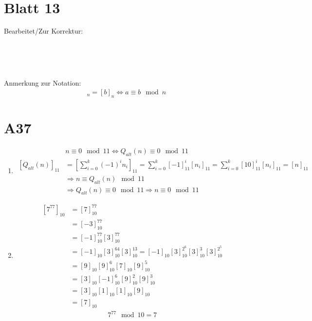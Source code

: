 \documentclass[fleqn,12pt]{scrartcl}
\newcommand{\blattn}{Blatt 13}
\begin{document}
\section*{\blattn}
Bearbeitet/Zur Korrektur:

\noindent
\begin{Form}
	\\
	\\
	\\
\end{Form}


Anmerkung zur Notation:
\begin{align*}
	[a]_n = [b]_n \Leftrightarrow a \equiv b \mod n
\end{align*}
\section*{A37}
\begin{enumerate}
	\item
		\begin{align*}
			&n \equiv 0 \mod 11 \Leftrightarrow Q_{alt}(n) \equiv 0  \mod 11\\
		\left[Q_{alt}(n)\right]_{11} &= \left[\sum_{i=0}^k (-1)^in_i\right]_{11} = \sum_{i=0}^k [-1]_{11}^i [n_i]_{11}
																							 = \sum_{i=0}^k
																							 [10]_{11}^i [n_i]_{11} = [n]_{11}\\
																							 &\Rightarrow n \equiv Q_{alt}(n) \mod 11\\
		&\Rightarrow Q_{alt}(n) \equiv 0 \mod 11\Rightarrow n \equiv 0 \mod 11 
		\end{align*}


	\item
		\begin{align*}
			\left[7^{77}\right]_{10} &= [7]_{10}^{77}\\ 
																											 &= [-3]^{77}_{10}\\
															 &=
			[-1]_{10}^{77}[3]^{77}_{10}\\
			&=	[-1]_{10} [3]_{10}^{64}[3]_{10}^{13} = [-1]_{10} [3]_{10}^{2^6} [3]_{10}^3 [3]_{10}^{2^5}\\
			&= [9]_{10} [9]_{10}^{6} [7]_{10} [9]_{10}^5\\
			&= [3]_{10} [-1]_{10}^6 [9]^2_{10} [9]^3_{10}\\
			&= [3]_{10} [1]_{10} [1]_{10}  [9]_{10}\\
			&= [7]_{10}
		\end{align*}
		\begin{align*}
			7^{77} \mod 10 = 7
		\end{align*}

\end{enumerate}
\end{document}
